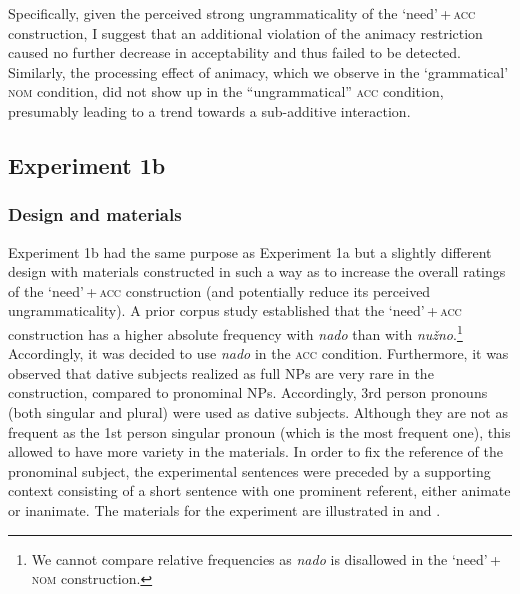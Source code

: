 \documentclass[output=paper]{langscibook}
\begin{document}
Specifically, given the perceived strong ungrammaticality of the `need'\,+\,\textsc{acc} construction, I suggest that an additional violation of the animacy restriction caused no further decrease in acceptability and thus failed to be detected. Similarly, the processing effect of animacy, which we observe in the `grammatical' \textsc{nom} condition, did not show up in the ``ungrammatical'' \textsc{acc} condition, presumably leading to a trend towards a sub-additive interaction.

\subsection{Experiment 1b}

\subsubsection{Design and materials}

Experiment 1b had the same purpose as Experiment 1a but a slightly different design with materials constructed in such a way as to increase the overall ratings of the `need'\,+\,\textsc{acc} construction (and potentially reduce its perceived ungrammaticality). A prior corpus study established that the `need'\,+\,\textsc{acc} construction has a higher absolute frequency with \textit{nado} than with \textit{nužno}.\footnote{We cannot compare relative frequencies as \textit{nado} is disallowed in the `need'\,+\,\textsc{nom} construction.} Accordingly, it was decided to use \textit{nado} in the \textsc{acc} condition. Furthermore, it was observed that dative subjects realized as full NPs are very rare in the construction, compared to pronominal NPs. Accordingly, 3rd person pronouns (both singular and plural) were used as dative subjects. Although they are not as frequent as the 1st person singular pronoun (which is the most frequent one), this allowed to have more variety in the materials. In order to fix the reference of the pronominal subject, the experimental sentences were preceded by a supporting context consisting of a short sentence with one prominent referent, either animate or inanimate. The materials for the experiment are illustrated in  and .
\end{document}
